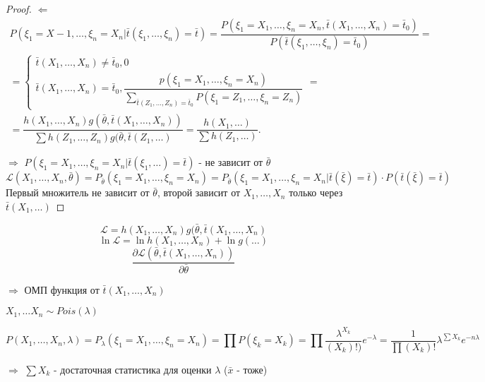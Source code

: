 \begin{proof}
  $\Leftarrow$ 
  \begin{multline*}
    P(\xi_1 = X-1, \dots, \xi_n = X_n | \bar t (\xi_1, \dots, \xi_n) = \bar t) = 
    \dfrac{P(\xi_1=X_1, \dots, \xi_n = X_n, \bar t(X_1, \dots, X_n) = \bar t_0)}{P(\bar t(\xi_1, \dots, \xi_n) = \bar t_0)} = \\
    = \begin{cases}
      \bar t(X_1, \dots, X_n) \neq \bar t_0, 0 \\
      \bar t(X_1, \dots, X_n) = \bar t_0, \dfrac{p(\xi_1 = X_1, \dots, \xi_n = X_n)}{\sum_{\bar t(Z_1, \dots, Z_n) = \bar t_0} P(\xi_1 = Z_1, \dots, \xi_n = Z_n)}
    \end{cases} = \\
  = \dfrac{h(X_1, \dots, X_n) g(\bar \theta, \bar t(X_1, \dots, X_n))}{\sum h(Z_1, \dots, Z_n) g(\bar\theta, \bar t(Z_1, \dots)} = \dfrac{h(X_1, \dots)}{\sum h(Z_1, \dots)}.
  \end{multline*}

  $\Rightarrow$
  $P(\xi_1 = X_1, \dots, \xi_n = X_n | \bar t(\xi_1, \dots) = \bar t)$ - не зависит от $\bar \theta$
  \begin{equation*}
    \mathcal{L} (X_1, \dots, X_n, \bar\theta) = P_{\bar\theta} (\xi_1 = X_1, \dots, \xi_n = X_n) = P_{\bar\theta} (\xi_1 = X_1, \dots, \xi_n = X_n | \bar t(\bar\xi) = \bar t) \cdot P(\bar t(\bar\xi) = \bar t)
  \end{equation*}
  Первый множитель не зависит от $\bar\theta$, второй зависит от $X_1, \dots, X_n$ только через $\bar t(X_1, \dots)$
\end{proof}

\begin{remark}
  \[
    \mathcal{L} = h(X_1, \dots, X_n) g(\bar\theta, \bar t(X_1, \dots, X_n)
  \]
  \[
    \ln \mathcal{L} = \ln h(X_1, \dots, X_n) + \ln g(\dots)
  \]
  \[
    \dfrac{\partial \mathcal{L} (\bar\theta, \bar t(X_1, \dots, X_n))}{\partial \bar\theta}  
  \]

  $\Rightarrow$ ОМП функция от $\bar t(X_1, \dots, X_n)$
\end{remark}

\begin{ex}
  $X_1, \dots X_n \sim Pois(\lambda)$

  \[
    P(X_1, \dots, X_n, \lambda) = P_\lambda (\xi_1=X_1, \dots, \xi_n=X_n) = \prod P(\xi_k = X_k) = \prod \dfrac{\lambda^{X_k}}{(X_k)!)} e^{-\lambda} = \dfrac{1}{\prod (X_k)!} \lambda^{\sum X_k} e^{-n\lambda}
  \]

  $\Rightarrow$ $\sum X_k$ - достаточная статистика для оценки $\lambda$ ($\bar x$ - тоже)
\end{ex}

